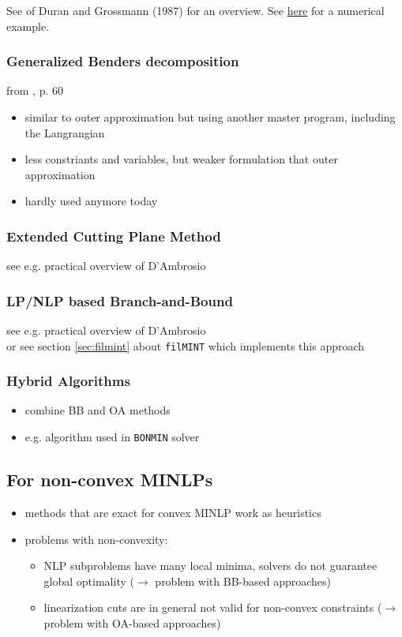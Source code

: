 \documentclass{article}
\begin{document}
\noindent
See \cite{duran1986outer} of Duran and Grossmann (1987) for an overview. See \href{https://optimization.mccormick.northwestern.edu/index.php/Outer-approximation_(OA)}{here} for a numerical example.

\subsubsection{Generalized Benders decomposition}
from \cite{sager2005numerical}, p. 60
\begin{itemize}
\item similar to outer approximation but using another master program, including the Langrangian
\item less constriants and variables, but weaker formulation that outer approximation
\item hardly used anymore today
\end{itemize}

\subsubsection{Extended Cutting Plane Method}
see e.g. practical overview of D'Ambrosio \cite{d2013mixed}
\subsubsection{LP/NLP based Branch-and-Bound}
see e.g. practical overview of D'Ambrosio \cite{d2013mixed}\\
or see section \ref{sec:filmint} about \texttt{filMINT} which implements this approach
\subsubsection{Hybrid Algorithms}
\begin{itemize}
\item combine BB and OA methods
\item e.g. algorithm used in \texttt{BONMIN} solver
\end{itemize}
\subsection{For non-convex MINLPs}
\begin{itemize}
\item methods that are exact for convex MINLP work as heuristics
\item problems with non-convexity: 
	\begin{itemize}
	\item NLP subproblems have many local minima, solvers do not guarantee global optimality ($\rightarrow$ problem with BB-based approaches)
	\item linearization cuts are in general not valid for non-convex constraints ($\rightarrow$ problem with OA-based approaches)
	\end{itemize}
\end{itemize}
\end{document}

